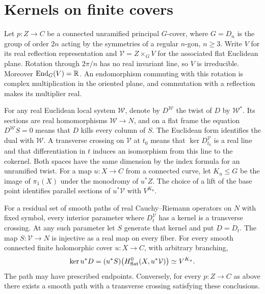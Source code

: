 \section{Kernels on finite covers}\label{sec:kernels}

Let $p:Z\to C$ be a connected unramified principal $G$-cover, where
$G=D_n$ is the group of order $2n$ acting by the symmetries of a regular
$n$-gon, $n\geq3$. Write $V$ for its real reflection representation
and $\mathcal V=Z\times_G V$ for the associated flat Euclidean plane.
Rotation through $2\pi/n$ has no real invariant line, so $V$ is
irreducible. Moreover $\operatorname{End}_G(V)=\mathbb R$. An endomorphism
commuting with this rotation is complex multiplication in the oriented
plane, and commutation with a reflection makes its multiplier real.

For any real Euclidean local system $\mathcal W$, denote by
$D^{\mathcal W}$ the twist of $D$ by $\mathcal W^*$. Its sections
are real homomorphisms $\mathcal W\to N$, and on a flat frame the
equation $D^{\mathcal W}S=0$ means that $D$ kills every column of $S$.
The Euclidean form identifies the dual with $\mathcal W$.
A transverse crossing on $\mathcal V$ at $t_0$ means that
$\ker D_{t_0}^{\mathcal V}$ is a real line and that differentiation
in $t$ induces an isomorphism from this line to the cokernel. Both
spaces have the same dimension by the index formula for an unramified twist.
For a map $u:X\to C$ from a connected curve, let $K_u\leq G$ be the
image of $\pi_1(X)$ under the monodromy of $u^*Z$. The choice of a
lift of the base point identifies parallel sections of $u^*\mathcal V$
with $V^{K_u}$.

\begin{theorem}\label{thm:kernels}
For a residual set of smooth paths of real Cauchy--Riemann operators
on $N$ with fixed symbol, every interior parameter where
$D_t^{\mathcal V}$ has a kernel is a transverse crossing. At any
such parameter let $S$ generate that kernel and put $D=D_t$. The map
$S:\mathcal V\to N$ is injective as a real map on every fiber. For
every smooth connected finite holomorphic cover $u:X\to C$, with
arbitrary branching,
\begin{equation}\label{eq:central-kernels}
 \ker u^*D
  =(u^*S)\bigl(H^0_{\rm flat}(X,u^*\mathcal V)\bigr)
  \simeq V^{K_u}.
\end{equation}
The path may have prescribed endpoints. Conversely, for every $p:Z\to C$
as above there exists a smooth path with a transverse crossing satisfying
these conclusions.
\end{theorem}

